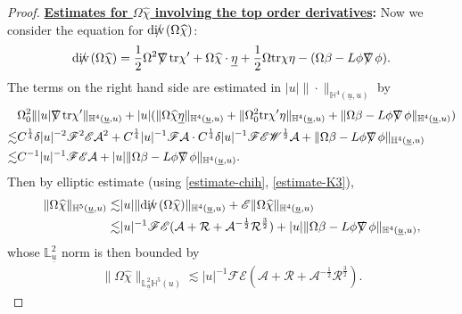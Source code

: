\documentclass[11pt,reqno]{amsart}
\theoremstyle{definition}
\numberwithin{equation}{section}
\newcommand{\tr}{\mathrm{tr}}
\renewcommand{\L}{\mathbb{L}}
\renewcommand{\H}{\mathbb{H}}
\def\chih{\widehat{\chi}}
\def\etab{\underline{\eta}}
\def\tr{\mathrm{tr}}
\def\ub{\underline{u}}
\def\nablas{\mbox{$\nabla \mkern -13mu /$ }}
\def\divs{\mbox{$\mathrm{div} \mkern -13mu /$ }}
\begin{document}
\begin{proof}
{\bf \underline{Estimates for $\Omega\chih$ involving the top order derivatives}:}  Now we consider the equation for $\divs(\Omega\chih)$:
\begin{align}\label{equ-divschih}
\divs(\Omega\chih)=\frac{1}{2}\Omega^2\nablas\tr \chi'+\Omega\chih\cdot\etab+\frac{1}{2}\Omega\tr \chi\eta-(\Omega\beta-L\phi\nablas\phi).\end{align}
The terms on the  right hand side are estimated in $|u|\|\cdot\|_{\H^4(\ub,u)}$ by
\begin{align*}
&\Omega_0^2\||u|\nablas\tr\chi'\|_{\H^4(\ub,u)}+|u|(\|\Omega\chih\etab\|_{\H^4(\ub,u)}+\|\Omega_0^2\tr\chi'\eta\|_{\H^4(\ub,u)}+\|\Omega\beta-L\phi\nablas\phi\|_{\H^4(\ub,u)})\\
\lesssim&C^{\frac{1}{4}}\delta|u|^{-2}\mathscr{F}^2\mathscr{E}\mathcal{A}^2+C^{\frac{1}{4}}|u|^{-1}\mathscr{F}\mathcal{A}\cdot C^{\frac{1}{4}}\delta|u|^{-1}\mathscr{F}\mathscr{E}\mathscr{W}^{\frac{1}{2}}\mathcal{A}+\|\Omega\beta-L\phi\nablas\phi\|_{\H^4(\ub,u)}\\
\lesssim&C^{-1}|u|^{-1}\mathscr{F}\mathscr{E}\mathcal{A}+|u|\|\Omega\beta-L\phi\nablas\phi\|_{\H^4(\ub,u)}.
\end{align*}
Then by elliptic estimate (using \eqref{estimate-chih}, \eqref{estimate-K3}),
\begin{align*}
\|\Omega\chih\|_{\H^5(\ub,u)}\lesssim&|u|\|\divs(\Omega\chih)\|_{\H^4(\ub,u)}+\mathscr{E}\|\Omega\chih\|_{\H^4(\ub,u)}\\
\lesssim&|u|^{-1}\mathscr{F}\mathscr{E}(\mathcal{A}+\mathcal{R}+\mathcal{A}^{-\frac{1}{2}}\mathcal{R}^{\frac{3}{2}})+|u|\|\Omega\beta-L\phi\nablas\phi\|_{\H^4(\ub,u)},
\end{align*}
whose $\L^2_{\ub}$ norm is then bounded by
\begin{align}\label{estimate-nablas5Omegachih}
\|\Omega\chih\|_{\L^2_{\ub}\H^5(u)}\lesssim|u|^{-1}\mathscr{F}\mathscr{E}(\mathcal{A}+\mathcal{R}+\mathcal{A}^{-\frac{1}{2}}\mathcal{R}^{\frac{3}{2}}).
\end{align}




\end{proof}
\end{document}
